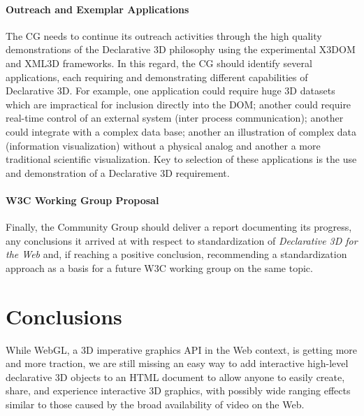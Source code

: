\documentclass[review]{acmsiggraph}
\begin{document}
\paragraph{Outreach and Exemplar Applications}
The CG needs to continue its outreach activities through the high quality demonstrations of the Declarative 3D philosophy using the experimental X3DOM and XML3D frameworks. %
In this regard, the CG should identify several applications, each requiring and demonstrating different capabilities of Declarative 3D. For example, one application could require huge 3D datasets which are impractical for inclusion directly into the DOM; another could require real-time control of an external system (inter process communication); another could integrate with a complex data base; another an illustration of complex data (information visualization) without a physical analog and another a more traditional scientific visualization. Key to selection of these applications is the use and demonstration of a Declarative 3D requirement.

\paragraph{W3C Working Group Proposal}
Finally, the Community Group should deliver a report documenting its progress, any conclusions it arrived at with respect to standardization of \textit{Declarative 3D for the Web} and, if reaching a positive conclusion, recommending a standardization approach as a basis for a future W3C working group on the same topic.



\section{Conclusions}
\label{sec:Conclusions}

While WebGL, a 3D imperative graphics API in the Web context, is getting more and more traction, we are still missing an easy way to add interactive high-level declarative 3D objects to an HTML document to allow anyone to easily create, share, and experience interactive 3D graphics, with possibly wide ranging effects similar to those caused by the broad availability of video on the Web.
\end{document}
